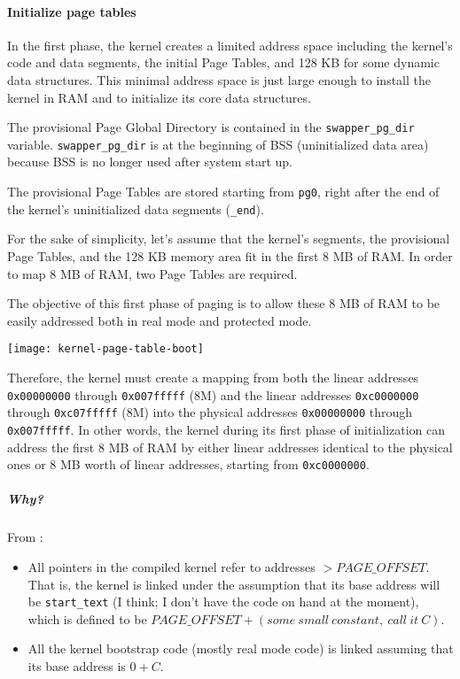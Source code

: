 \paragraph{Initialize page tables}

In the first phase, the kernel creates a limited address space including the kernel's code
and data segments, the initial Page Tables, and 128 KB for some dynamic data
structures. This minimal address space is just large enough to install the kernel in RAM
and to initialize its core data structures.

The provisional Page Global Directory is contained in the \texttt{swapper\_pg\_dir}
variable. \texttt{swapper\_pg\_dir} is at the beginning of BSS (uninitialized data area)
because BSS is no longer used after system start up.

The provisional Page Tables are stored starting from \texttt{pg0}, right after the end of
the kernel's uninitialized data segments (\texttt{\_end}).

For the sake of simplicity, let's assume that the kernel's segments, the provisional Page
Tables, and the 128 KB memory area fit in the first 8 MB of RAM. In order to map 8 MB of
RAM, two Page Tables are required.

The objective of this first phase of paging is to allow these 8 MB of RAM to be easily
addressed both in real mode and protected mode.

\begin{center}
  \texttt{[image: kernel-page-table-boot]}
\end{center}

Therefore, the kernel must create a mapping from both the linear addresses
\texttt{0x00000000} through \texttt{0x007fffff} (8M) and the linear addresses
\texttt{0xc0000000} through \texttt{0xc07fffff} (8M) into the physical addresses
\texttt{0x00000000} through \texttt{0x007fffff}. In other words, the kernel during its
first phase of initialization can address the first 8 MB of RAM by either linear addresses
identical to the physical ones or 8 MB worth of linear addresses, starting from
\texttt{0xc0000000}.

\subparagraph{Why?}

From :
  
\begin{itemize}
\item All pointers in the compiled kernel refer to addresses $> PAGE\_OFFSET$. That is,
  the kernel is linked under the assumption that its base address will be
  \texttt{start\_text} (I think; I don't have the code on hand at the moment), which is
  defined to be $PAGE\_OFFSET+(some\ small\ constant,\ call\ it\ C)$.
\item All the kernel bootstrap code (mostly real mode code) is linked assuming that its
  base address is $0+C$.
\end{itemize}

